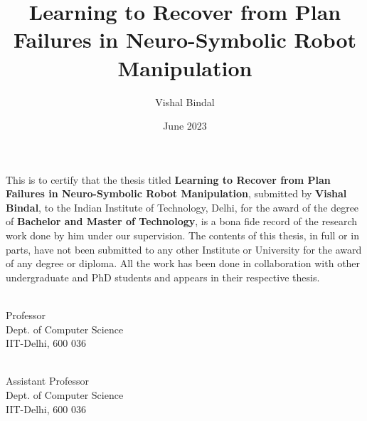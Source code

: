 \documentclass[Dual]{iitddiss}
\begin{document}


\title{Learning to Recover from Plan Failures in Neuro-Symbolic Robot Manipulation}

\author{Vishal Bindal}
\date{June 2023}

\maketitle

\certificate

\vspace*{0.5in}

\noindent This is to certify that the thesis titled {\bf Learning to Recover from Plan Failures in Neuro-Symbolic Robot Manipulation}, submitted by {\bf Vishal Bindal},
  to the Indian Institute of Technology, Delhi, for
the award of the degree of {\bf Bachelor and Master of Technology}, is a bona fide
record of the research work done by him under our supervision.  The
contents of this thesis, in full or in parts, have not been submitted
to any other Institute or University for the award of any degree or
diploma. All the work has been done in collaboration with other undergraduate and PhD students and appears in their respective thesis.

\vspace*{1.5in}

\begin{singlespacing}
\hspace*{-0.25in}
\begin{minipage}{2.5in}
 \\
\noindent Professor \\
\noindent Dept. of Computer Science\\
\noindent IIT-Delhi, 600 036 \\
\end{minipage}
\hspace{0.5in}
\begin{minipage}{2.5in}
 \\
\noindent Assistant Professor \\
\noindent Dept. of Computer Science\\
\noindent IIT-Delhi, 600 036 \\
\end{minipage}
\end{singlespacing}
\vspace*{0.25in}
\end{document}
